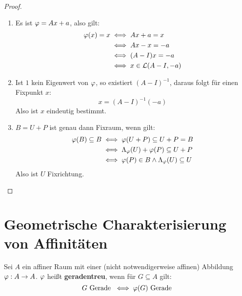 \documentclass[parskip,a4paper,twoside,DIV15,BCOR12mm]{scrbook}
\begin{document}
\begin{proof}
\begin{enumerate}
\item Es ist $\varphi=Ax+a$, also gilt:
\begin{align*}
\varphi(x)=x &\iff Ax+a=x\\
&\iff Ax-x=-a\\
&\iff (A-I)x=-a\\
&\iff x\in\mathcal{L}(A-I,-a)
\end{align*}
\item Ist $1$ kein Eigenwert von $\varphi$, so existiert $(A-I)^{-1}$, daraus folgt für 
einen Fixpunkt $x$:
\[x=(A-I)^{-1}(-a)\]
Also ist $x$ eindeutig bestimmt.
\item $B=U+P$ ist genau dann Fixraum, wenn gilt:
\begin{align*}
\varphi(B)\subseteq B &\iff \varphi(U+P)\subseteq U+P=B\\
&\iff \Lambda_\varphi(U)+\varphi(P)\subseteq U+P\\
&\iff \varphi(P)\in B\wedge \Lambda_\varphi(U)\subseteq U
\end{align*}
Also ist $U$ Fixrichtung.
\end{enumerate}
\end{proof}

\section{Geometrische Charakterisierung von Affinitäten}
\begin{definition}
Sei $A$ ein affiner Raum mit einer (nicht notwendigerweise affinen) Abbildung
$\varphi:A\to A$. $\varphi$ heißt \textbf{geradentreu}, wenn für $G\subseteq A$ gilt:
\[G \text{ Gerade } \iff \varphi(G) \text{ Gerade}\]
\end{definition}
\end{document}

